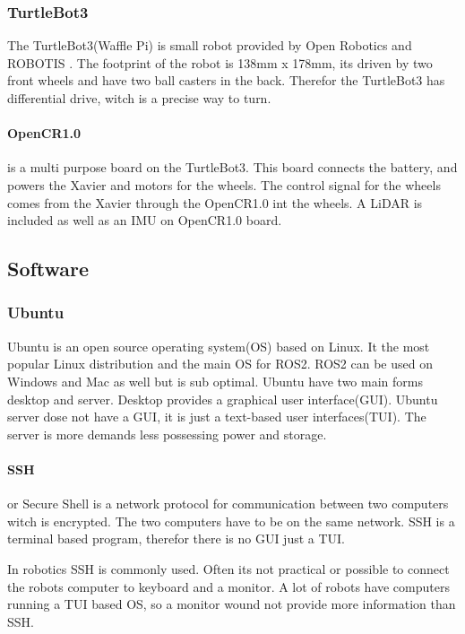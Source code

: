 \subsubsection{TurtleBot3}
The TurtleBot3(Waffle Pi) is small robot provided by Open Robotics and ROBOTIS \cite{turtlebot3}. The footprint of the robot is 138mm x 178mm, its driven by two front wheels and have two ball casters in the back. Therefor the TurtleBot3 has differential drive, witch is a precise way to turn. 

\paragraph{OpenCR1.0} is a multi purpose board on the TurtleBot3\cite{opencr10}. This board connects the battery, and powers the Xavier and motors for the wheels. The control signal for the wheels comes from the Xavier through the OpenCR1.0 int the wheels. 
A LiDAR is included as well as an IMU on OpenCR1.0 board.


\subsection{Software}

\subsubsection{Ubuntu}

Ubuntu is an open source operating system(OS) based on Linux\cite{ubuntu}\cite{osi}. It the most popular Linux distribution and the main OS for ROS2. ROS2 can be used on Windows and Mac as well but is sub optimal. Ubuntu have two main forms desktop and server. Desktop provides a graphical user interface(GUI). Ubuntu server dose not have a GUI, it is just a text-based user interfaces(TUI). The server is more demands less possessing power and storage. 


\paragraph{SSH} or Secure Shell is a network protocol for communication between two computers witch is encrypted. The two computers have to be on the same network. SSH is a terminal based program, therefor there is no GUI just a TUI. 

In robotics SSH is commonly used. Often its not practical or possible to connect the robots computer to keyboard and a monitor. A lot of robots have computers running a TUI based OS, so a monitor wound not provide more information than SSH. 

